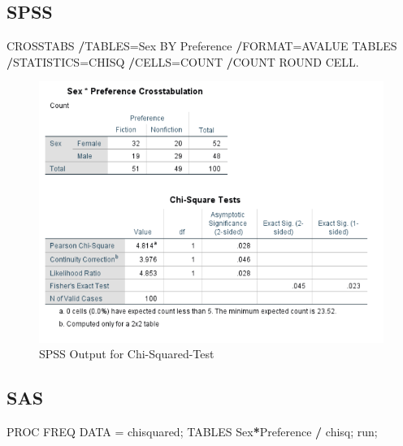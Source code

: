 \documentclass[
]{book}
\newenvironment{Shaded}{\begin{snugshade}}{\end{snugshade}}
\newcommand{\NormalTok}[1]{#1}
\newcommand{\OperatorTok}[1]{\textcolor[rgb]{0.81,0.36,0.00}{\textbf{#1}}}
\newcommand{\StringTok}[1]{\textcolor[rgb]{0.31,0.60,0.02}{#1}}
\begin{document}
\hypertarget{spss-2}{%
\subsection{SPSS}\label{spss-2}}

\begin{Shaded}
\begin{Highlighting}[]
\NormalTok{CROSSTABS}
  \OperatorTok{/}\NormalTok{TABLES=Sex BY Preference}
  \OperatorTok{/}\NormalTok{FORMAT=AVALUE TABLES}
  \OperatorTok{/}\NormalTok{STATISTICS=CHISQ }
  \OperatorTok{/}\NormalTok{CELLS=COUNT }
  \OperatorTok{/}\NormalTok{COUNT ROUND CELL.}
\end{Highlighting}
\end{Shaded}

\begin{figure}[!h]
\includegraphics{Screenshots/Chi Squared/ChiSquaredSPSS} \caption{\label{fig:cstSPSS}SPSS Output for Chi-Squared-Test}\label{fig:cstSPSS}
\end{figure}

\hypertarget{sas-2}{%
\subsection{SAS}\label{sas-2}}

\begin{Shaded}
\begin{Highlighting}[]
\NormalTok{PROC FREQ DATA =}\StringTok{ }\NormalTok{chisquared;}
\NormalTok{TABLES Sex}\OperatorTok{*}\NormalTok{Preference }\OperatorTok{/}\StringTok{ }\NormalTok{chisq;}
\NormalTok{run;}
\end{Highlighting}
\end{Shaded}
\end{document}
